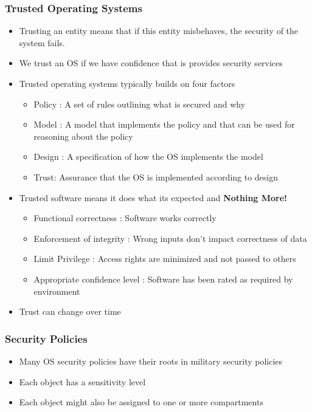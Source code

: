 \documentclass[twoside]{article}
\begin{document}
\subsubsection{Trusted Operating Systems}
\begin{itemize}
\item Trusting an entity means that if this entity misbehaves, the security of the system fails.
\item We trust an OS if we have confidence that is provides security services
\item Trusted operating systems typically builds on four factors 
\begin{itemize}
\item Policy : A set of rules outlining what is secured and why
\item Model : A model that implements the policy and that can be used for reasoning about the policy
\item Design : A specification of how the OS implements the model 
\item Trust: Assurance that the OS is implemented according to design 
\end{itemize}
\item Trusted software means it does what its expected and \textbf{Nothing More!}
\begin{itemize}
\item Functional correctness : Software works correctly
\item Enforcement of integrity : Wrong inputs don't impact correctness of data
\item Limit Privilege : Access rights are minimized and not passed to others
\item Appropriate confidence level : Software has been rated as required by environment
\end{itemize}
\item Trust can change over time
\end{itemize}
\subsubsection{Security Policies}
\begin{itemize}
\item Many OS security policies have their roots in military security policies
\item Each object has a sensitivity level 
\item Each object might also be assigned to one or more compartments

\end{itemize}
\end{document}
